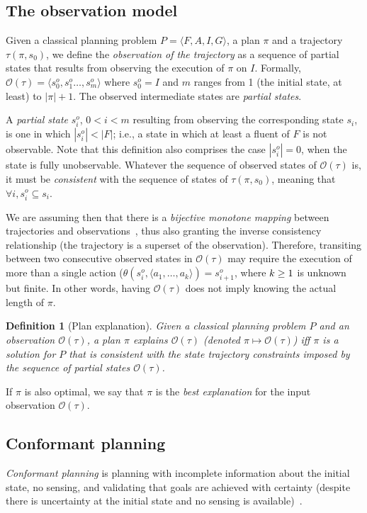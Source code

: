 \documentclass{article}
\newcommand{\tup}[1]{{\langle #1 \rangle}}
\newtheorem{definition}[theorem]{Definition}
\begin{document}
\subsection{The observation model}
Given a classical planning problem $P=\tup{F,A,I,G}$, a plan $\pi$ and a trajectory $\tau(\pi,s_0)$, we define the \emph{observation of the trajectory} as a sequence of partial states that results from observing the execution of $\pi$ on $I$. Formally, $\mathcal{O}(\tau)=\tup{s_0^o,s_1^o \ldots , s_m^o}$ where $s_0^o=I$ and $m$ ranges from 1 (the initial state, at least) to $|\pi|+1$. The observed intermediate states are {\em partial states}.

A {\em partial state} $s_i^o$, {\small $0<i<m$} resulting from observing the corresponding state $s_i$, is one in which $|s_i^o| < |F|$; i.e., a state in which at least a fluent of $F$ is not observable. Note that this definition also comprises the case $|s_i^o| = 0$, when the state is fully unobservable. Whatever the sequence of observed states of $\mathcal{O}(\tau)$ is, it must be {\em consistent} with the sequence of states of $\tau(\pi,s_0)$, meaning that $\forall i, s_i^o \subseteq s_i$. 

We are assuming then that there is a {\em bijective monotone mapping} between trajectories and observations~\cite{ramirez2009plan}, thus also granting the inverse consistency relationship (the trajectory is a superset of the observation). Therefore, transiting between two consecutive observed states in $\mathcal{O}(\tau)$ may require the execution of more than a single action ($\theta(s_i^o,\tup{a_1,\ldots,a_k})=s_{i+1}^o$, where ${\small k\geq 1}$ is unknown but finite. In other words, having $\mathcal{O}(\tau)$ does not imply knowing the actual length of $\pi$.

\begin{definition}[Plan explanation]
Given a {\em classical planning problem} $P$ and an observation $\mathcal{O}(\tau)$, a plan $\pi$ {\em explains} $\mathcal{O}(\tau)$ (denoted $\pi\mapsto\mathcal{O}(\tau)$) iff $\pi$ is a solution for $P$ that is {\em consistent} with the state trajectory constraints imposed by the sequence of partial states $\mathcal{O}(\tau)$.  
\end{definition}
If $\pi$ is also optimal, we say that $\pi$ is the {\em best explanation} for the input observation $\mathcal{O}(\tau)$.


\subsection{Conformant planning}
{\em Conformant planning} is planning with incomplete information about the initial state, no sensing, and validating that goals are achieved with certainty (despite there is uncertainty at the initial state and no sensing is available)~\cite{goldman1996expressive,smith1998conformant,bonet2000planning}.
\end{document}
